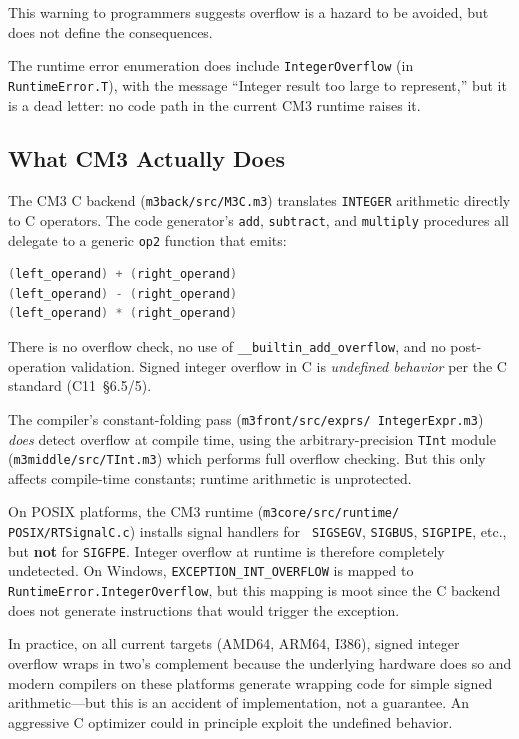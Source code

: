 \documentclass[12pt]{report}
\begin{document}
\noindent This warning to programmers suggests overflow is a hazard
to be avoided, but does not define the consequences.

The runtime error enumeration does include {\tt IntegerOverflow}
(in {\tt RuntimeError.T}), with the message ``Integer result too
large to represent,'' but it is a dead letter: no code path in the
current CM3 runtime raises it.

\subsection{What CM3 Actually Does}

The CM3 C backend ({\tt m3back/src/M3C.m3}) translates {\tt INTEGER}
arithmetic directly to C operators.  The code generator's {\tt add},
{\tt subtract}, and {\tt multiply} procedures all delegate to a
generic {\tt op2} function that emits:

\begin{lstlisting}[language=C]
(left_operand) + (right_operand)
(left_operand) - (right_operand)
(left_operand) * (right_operand)
\end{lstlisting}

\noindent There is no overflow check, no use of
{\tt \_\_builtin\_add\_overflow}, and no post-operation validation.
Signed integer overflow in C is \emph{undefined behavior} per the
C standard (C11~\S6.5/5).

The compiler's constant-folding pass ({\tt m3front/src/exprs/\allowbreak
IntegerExpr.m3}) \emph{does} detect overflow at compile time, using
the arbitrary-precision {\tt TInt} module ({\tt m3middle/src/TInt.m3})
which performs full overflow checking.  But this only affects
compile-time constants; runtime arithmetic is unprotected.

On POSIX platforms, the CM3 runtime ({\tt m3core/src/runtime/\allowbreak
POSIX/\allowbreak RTSignalC.c}) installs signal handlers for {\tt
SIGSEGV}, {\tt SIGBUS}, {\tt SIGPIPE}, etc., but \textbf{not} for
{\tt SIGFPE}.  Integer overflow at runtime is therefore completely
undetected.  On Windows, {\tt EXCEPTION\_INT\_OVERFLOW} is mapped to
{\tt RuntimeError.IntegerOverflow}, but this mapping is moot since
the C backend does not generate instructions that would trigger
the exception.

In practice, on all current targets (AMD64, ARM64, I386), signed
integer overflow wraps in two's complement because the underlying
hardware does so and modern compilers on these platforms generate
wrapping code for simple signed arithmetic---but this is an
accident of implementation, not a guarantee.  An aggressive C
optimizer could in principle exploit the undefined behavior.
\end{document}
